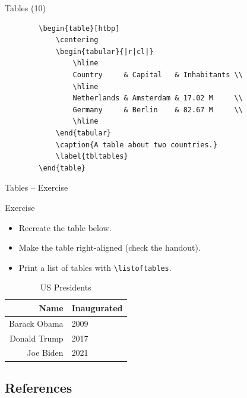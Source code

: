 \documentclass{beamer}
\newcommand{\switch}[1]{\texttt{\textbackslash#1}}
\begin{document}
\begin{frame}[fragile]{Tables (10)}
    \small
    \begin{verbatim}
        \begin{table}[htbp]
            \centering
            \begin{tabular}{|r|cl|}
                \hline
                Country     & Capital   & Inhabitants \\
                \hline
                Netherlands & Amsterdam & 17.02 M     \\
                Germany     & Berlin    & 82.67 M     \\
                \hline
            \end{tabular}
            \caption{A table about two countries.}
            \label{tbltables}
        \end{table}
        \end{verbatim}
\end{frame}

\begin{frame}{Tables -- Exercise}
    \begin{block}{Exercise}

        \begin{itemize}
            \item Recreate the table below.
            \item Make the table right-aligned (check the handout).
            \item Print a list of tables with \switch{listoftables}.
        \end{itemize}
        \begin{table}[ht!]
            \flushright
            \begin{tabular}{r|l}
                \hline
                \textbf{Name} & \textbf{Inaugurated} \\\hline
                Barack Obama  & 2009                 \\
                Donald Trump  & 2017                 \\
                Joe Biden     & 2021                 \\\hline
            \end{tabular}
            \caption{US Presidents}
        \end{table}
    \end{block}
\end{frame}

\subsection{References}
\end{document}
